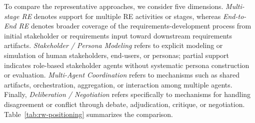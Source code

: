 To compare the representative approaches, we consider five dimensions. \emph{Multi-stage RE} denotes support for multiple RE activities or stages, whereas \emph{End-to-End RE} denotes broader coverage of the requirements-development process from initial stakeholder or requirements input toward downstream requirements artifacts. \emph{Stakeholder / Persona Modeling} refers to explicit modeling or simulation of human stakeholders, end-users, or personas; partial support indicates role-based stakeholder agents without systematic persona construction or evaluation. \emph{Multi-Agent Coordination} refers to mechanisms such as shared artifacts, orchestration, aggregation, or interaction among multiple agents. Finally, \emph{Deliberation / Negotiation} refers specifically to mechanisms for handling disagreement or conflict through debate, adjudication, critique, or negotiation. Table~\ref{tab:rw-positioning} summarizes the comparison.

